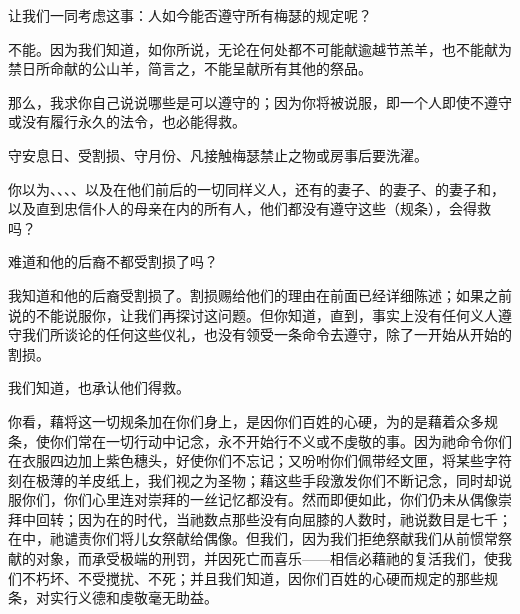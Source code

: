 让我们一同考虑这事：人如今能否遵守所有梅瑟的规定呢？\par

不能。因为我们知道，如你所说，无论在何处都不可能献逾越节羔羊，也不能献为禁日所命献的公山羊，简言之，不能呈献所有其他的祭品。\par

那么，我求你自己说说哪些是可以遵守的；因为你将被说服，即一个人即使不遵守或没有履行永久的法令，也必能得救。\par

守安息日、受割损、守月份、凡接触梅瑟禁止之物或房事后要洗濯。\par

你以为、、、、以及在他们前后的一切同样义人，还有的妻子、的妻子、的妻子和，以及直到忠信仆人的母亲在内的所有人，他们都没有遵守这些（规条），会得救吗？\par

难道和他的后裔不都受割损了吗？\par

我知道和他的后裔受割损了。割损赐给他们的理由在前面已经详细陈述；如果之前说的不能说服你，让我们再探讨这问题。但你知道，直到，事实上没有任何义人遵守我们所谈论的任何这些仪礼，也没有领受一条命令去遵守，除了一开始从开始的割损。\par

我们知道，也承认他们得救。\par

你看，藉将这一切规条加在你们身上，是因你们百姓的心硬，为的是藉着众多规条，使你们常在一切行动中记念，永不开始行不义或不虔敬的事。因为祂命令你们在衣服四边加上紫色穗头，好使你们不忘记；又吩咐你们佩带经文匣，将某些字符刻在极薄的羊皮纸上，我们视之为圣物；藉这些手段激发你们不断记念，同时却说服你们，你们心里连对崇拜的一丝记忆都没有。然而即便如此，你们仍未从偶像崇拜中回转；因为在的时代，当祂数点那些没有向屈膝的人数时，祂说数目是七千；在中，祂谴责你们将儿女祭献给偶像。但我们，因为我们拒绝祭献我们从前惯常祭献的对象，而承受极端的刑罚，并因死亡而喜乐——相信必藉祂的复活我们，使我们不朽坏、不受搅扰、不死；并且我们知道，因你们百姓的心硬而规定的那些规条，对实行义德和虔敬毫无助益。\par

